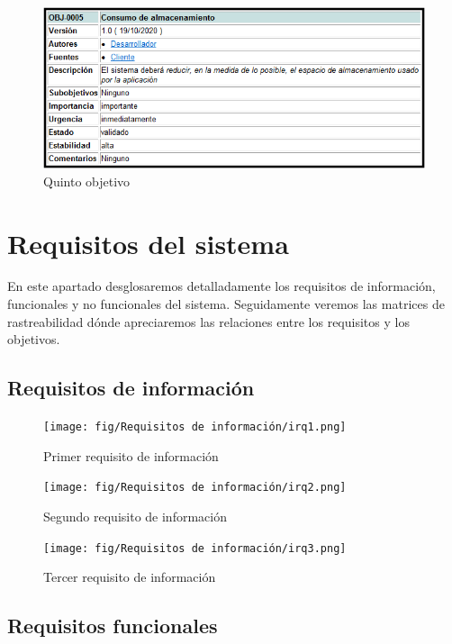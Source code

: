 \begin{figure}[H]
    \centering
    \includegraphics[width=1\linewidth]{fig/Objetivos del sistema/Imagen5.png}
    \caption{Quinto objetivo}
    \label{fig:objetivo5}
\end{figure}

\vspace{1cm}

\section{Requisitos del sistema}

En este apartado desglosaremos detalladamente los requisitos de información, funcionales y no funcionales del sistema. Seguidamente veremos las matrices de rastreabilidad dónde apreciaremos las relaciones entre los requisitos y los objetivos.

\subsection{Requisitos de información}\label{cap:Requisitos del sistema}

\begin{figure}[H]
    \centering
    \texttt{[image: fig/Requisitos de información/irq1.png]}
    \caption{Primer requisito de información}
    \label{fig:irq1}
\end{figure}
\begin{figure}[H]
    \centering
    \texttt{[image: fig/Requisitos de información/irq2.png]}
    \caption{Segundo requisito de información}
    \label{fig:irq2}
\end{figure}
\begin{figure}[H]
    \centering
    \texttt{[image: fig/Requisitos de información/irq3.png]}
    \caption{Tercer requisito de información}
    \label{fig:irq3}
\end{figure}

\subsection{Requisitos funcionales}

